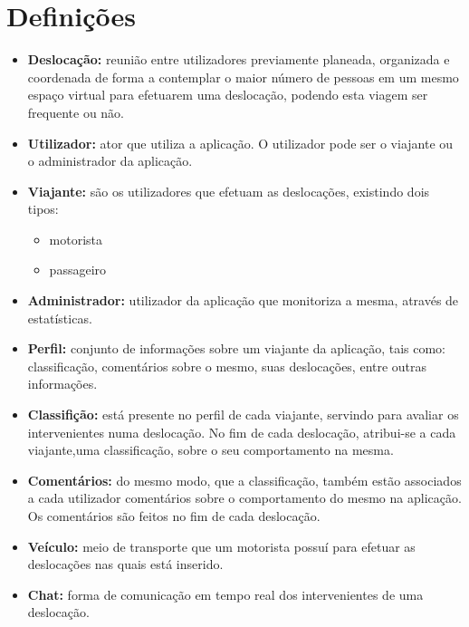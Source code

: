 \section{Definições}
\begin{itemize}
    \item \textbf{Deslocação:} reunião entre utilizadores previamente planeada, organizada e coordenada de forma a contemplar o maior número de pessoas em um mesmo espaço virtual para efetuarem uma deslocação, podendo esta viagem ser frequente ou não.
    \item \textbf{Utilizador:} ator que utiliza a aplicação. O utilizador pode ser o viajante ou o administrador da aplicação.
    \item \textbf{Viajante:} são os utilizadores que efetuam as deslocações, existindo dois tipos:
    \begin{itemize}
        \item motorista
        \item passageiro
    \end{itemize}
    \item \textbf{Administrador:} utilizador da aplicação que monitoriza a mesma, através de estatísticas.
    \item \textbf{Perfil:} conjunto de informações sobre um viajante da aplicação, tais como: classificação, comentários sobre o mesmo, suas deslocações, entre outras informações.
    \item \textbf{Classifição:} está presente no perfil de cada viajante, servindo para avaliar os intervenientes numa deslocação. No fim de cada deslocação, atribui-se a cada viajante,uma classificação, sobre o seu comportamento na mesma. 
    \item \textbf{Comentários:} do mesmo modo, que a classificação, também estão associados a cada utilizador comentários sobre o comportamento do mesmo na aplicação. Os comentários são feitos no fim de cada deslocação.
    \item \textbf{Veículo:} meio de transporte que um motorista possuí para efetuar as deslocações nas quais está inserido.
    \item \textbf{Chat:} forma de comunicação em tempo real dos intervenientes de uma deslocação.
\end{itemize}{}